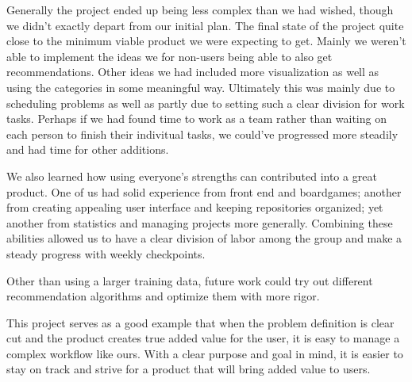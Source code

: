 \documentclass[a4paper,12pt,bibliography=totoc,numbers=noenddot,sfdefaults=false,abstract=true,notitlepage]{scrartcl} %
\begin{document}
	Generally the project ended up being less complex than we had wished, though we didn't exactly depart from our initial plan. The final state of the project quite close to the minimum viable product we were expecting to get. Mainly we weren't able to implement the ideas we for non-users being able to also get recommendations. Other ideas we had included more visualization as well as using the categories in some meaningful way. Ultimately this was mainly due to scheduling problems as well as partly due to setting such a clear division for work tasks. Perhaps if we had found time to work as a team rather than waiting on each person to finish their indivitual tasks, we could've progressed more steadily and had time for other additions.

	
	We also learned how using everyone's strengths can contributed into a great product. One of us had solid experience from front end and boardgames; another from creating appealing user interface and keeping repositories organized; yet another from statistics and managing projects more generally. Combining these abilities allowed us to have a clear division of labor among the group and make a steady progress with weekly checkpoints.
	
	
	Other than using a larger training data, future work could try out different recommendation algorithms and optimize them with more rigor.
	
	This project serves as a good example that when the problem definition is clear cut and the product creates true added value for the user, it is easy to manage a complex workflow like ours. With a clear purpose and goal in mind, it is easier to stay on track and strive for a product that will bring added value to users.
	
	\FloatBarrier
	\printbibliography
	
\end{document}
